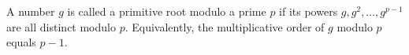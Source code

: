 A number $g$ is called a primitive root modulo a prime $p$ if its powers $g,g^2,\ldots,g^{p-1}$ are all distinct modulo $p$. Equivalently, the multiplicative order of $g$ modulo $p$ equals $p-1$.
